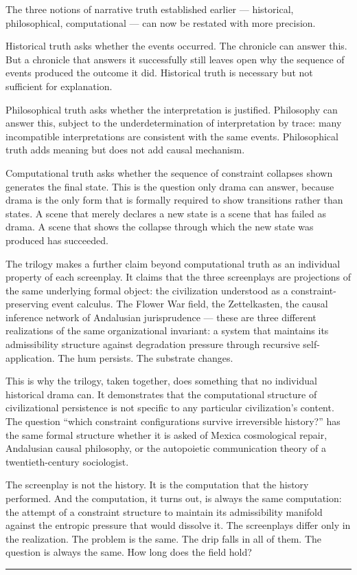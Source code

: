 \documentclass[11pt, a4paper]{article}
\theoremstyle{definition}
\theoremstyle{remark}
\begin{document}
The three notions of narrative truth established earlier --- historical,
philosophical, computational --- can now be restated with more precision.

Historical truth asks whether the events occurred. The chronicle can answer
this. But a chronicle that answers it successfully still leaves open why
the sequence of events produced the outcome it did. Historical truth is
necessary but not sufficient for explanation.

Philosophical truth asks whether the interpretation is justified. Philosophy
can answer this, subject to the underdetermination of interpretation by trace:
many incompatible interpretations are consistent with the same events.
Philosophical truth adds meaning but does not add causal mechanism.

Computational truth asks whether the sequence of constraint collapses shown
generates the final state. This is the question only drama can answer,
because drama is the only form that is formally required to show transitions
rather than states. A scene that merely declares a new state is a scene that
has failed as drama. A scene that shows the collapse through which the new
state was produced has succeeded.

The trilogy makes a further claim beyond computational truth as an individual
property of each screenplay. It claims that the three screenplays are
projections of the same underlying formal object: the civilization understood
as a constraint-preserving event calculus. The Flower War field, the
Zettelkasten, the causal inference network of Andalusian jurisprudence ---
these are three different realizations of the same organizational invariant:
a system that maintains its admissibility structure against degradation pressure
through recursive self-application. The hum persists. The substrate changes.

This is why the trilogy, taken together, does something that no individual
historical drama can. It demonstrates that the computational structure of
civilizational persistence is not specific to any particular civilization's
content. The question ``which constraint configurations survive irreversible
history?'' has the same formal structure whether it is asked of Mexica
cosmological repair, Andalusian causal philosophy, or the autopoietic
communication theory of a twentieth-century sociologist.

The screenplay is not the history. It is the computation that the history
performed. And the computation, it turns out, is always the same computation:
the attempt of a constraint structure to maintain its admissibility manifold
against the entropic pressure that would dissolve it. The screenplays differ
only in the realization. The problem is the same. The drip falls in all of
them. The question is always the same. How long does the field hold?

\bigskip

\noindent\rule{0.4\textwidth}{0.4pt}

\vspace{0.5em}
\end{document}
